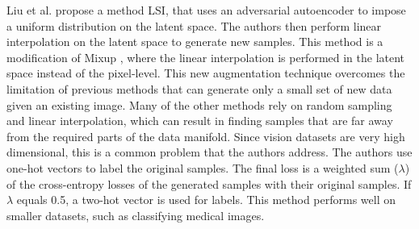 Liu et al. \cite{liuDataAugmentationLatent2018} propose a method LSI, that uses an adversarial autoencoder to impose a uniform distribution on the latent space. The authors then perform linear interpolation on the latent space to generate new samples. This method is a modification of Mixup \cite{zhangMixupEmpiricalRisk2018}, where the linear interpolation is performed in the latent space instead of the pixel-level. This new augmentation technique overcomes the limitation of previous methods that can generate only a small set of new data given an existing image. Many of the other methods rely on random sampling and linear interpolation, which can result in finding samples that are far away from the required parts of the data manifold. Since vision datasets are very high dimensional, this is a common problem that the authors address. The authors use one-hot vectors to label the original samples. The final loss is a weighted sum ($\lambda$) of the cross-entropy losses of the generated samples with their original samples. If $\lambda$ equals 0.5, a two-hot vector is used for labels. This method performs well on smaller datasets, such as classifying medical images.

